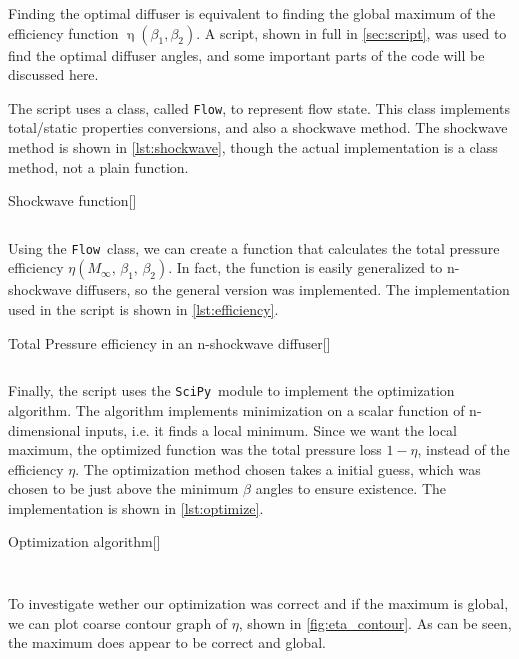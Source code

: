 \documentclass[12pt, openright, oneside, a4paper, english]{unbtex}
\newcommand{\Flow}{\texttt{Flow}}
\newcommand{\scipy}{\texttt{SciPy}}
\begin{document}
Finding the optimal diffuser is equivalent to finding the global maximum of the efficiency function \(\operatorname{\eta}(\beta_1, \beta_2)\). A script, shown in full in \cref{sec:script}, was used to find the optimal diffuser angles, and some important parts of the code will be discussed here.

The script uses a class, called \Flow, to represent flow state. This class implements total/static properties conversions, and also a shockwave method. The shockwave method is shown in \cref{lst:shockwave}, though the actual implementation is a class method, not a plain function.

\begin{splitcode}[label=lst:shockwave, breakable]{Shockwave function}[]
    \inputminted{python}{listings/shockwave}
\end{splitcode}

Using the \Flow\ class, we can create a function that calculates the total pressure efficiency \(\eta(M_\infty,\, \beta_1,\, \beta_2)\). In fact, the function is easily generalized to n-shockwave diffusers, so the general version was implemented. The implementation used in the script is shown in \cref{lst:efficiency}.

\begin{splitcode}[label=lst:efficiency]{Total Pressure efficiency in an n-shockwave diffuser}[]
    \inputminted{python}{listings/nShock_p0_eff}
\end{splitcode}

Finally, the script uses the \scipy\ module to implement the optimization algorithm. The algorithm implements minimization on a scalar function of n-dimensional inputs, i.e. it finds a local minimum. Since we want the local maximum, the optimized function was the total pressure loss \(1-\eta\), instead of the efficiency \(\eta\). The optimization method chosen takes a initial guess, which was chosen to be just above the minimum \(\beta\) angles to ensure existence. The implementation is shown in \cref{lst:optimize}.

\begin{splitcode}[label=lst:optimize]{Optimization algorithm}[]
    \inputminted{python}{listings/optimize}
    \tcblower
    \inputminted{output}{listings/optimize.o}
\end{splitcode}

To investigate wether our optimization was correct and if the maximum is global, we can plot coarse contour graph of \(\eta\), shown in \cref{fig:eta_contour}. As can be seen, the maximum does appear to be correct and global.
\end{document}
